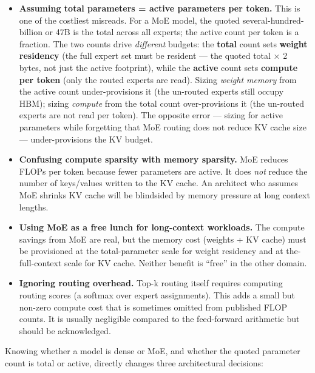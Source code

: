 \begin{itemize}
\item
  \textbf{Assuming total parameters = active parameters per token.} This
  is one of the costliest misreads. For a MoE model, the quoted
  several-hundred-billion or 47B is the total across all experts; the
  active count per token is a fraction. The two counts drive
  \emph{different} budgets: the \textbf{total} count sets \textbf{weight
  residency} (the full expert set must be resident --- the quoted total
  × 2 bytes, not just the active footprint), while the \textbf{active}
  count sets \textbf{compute per token} (only the routed experts are
  read). Sizing \emph{weight memory} from the active count
  under-provisions it (the un-routed experts still occupy HBM); sizing
  \emph{compute} from the total count over-provisions it (the un-routed
  experts are not read per token). The opposite error --- sizing for
  active parameters while forgetting that MoE routing does not reduce KV
  cache size --- under-provisions the KV budget.
\item
  \textbf{Confusing compute sparsity with memory sparsity.} MoE reduces
  FLOPs per token because fewer parameters are active. It does
  \emph{not} reduce the number of keys/values written to the KV cache.
  An architect who assumes MoE shrinks KV cache will be blindsided by
  memory pressure at long context lengths.
\item
  \textbf{Using MoE as a free lunch for long-context workloads.} The
  compute savings from MoE are real, but the memory cost (weights + KV
  cache) must be provisioned at the total-parameter scale for weight
  residency and at the-full-context scale for KV cache. Neither benefit
  is ``free'' in the other domain.
\item
  \textbf{Ignoring routing overhead.} Top-k routing itself requires
  computing routing scores (a softmax over expert assignments). This
  adds a small but non-zero compute cost that is sometimes omitted from
  published FLOP counts. It is usually negligible compared to the
  feed-forward arithmetic but should be acknowledged.
\end{itemize}

\label{architecture-consequence}


Knowing whether a model is dense or MoE, and whether the quoted
parameter count is total or active, directly changes three architectural
decisions:

